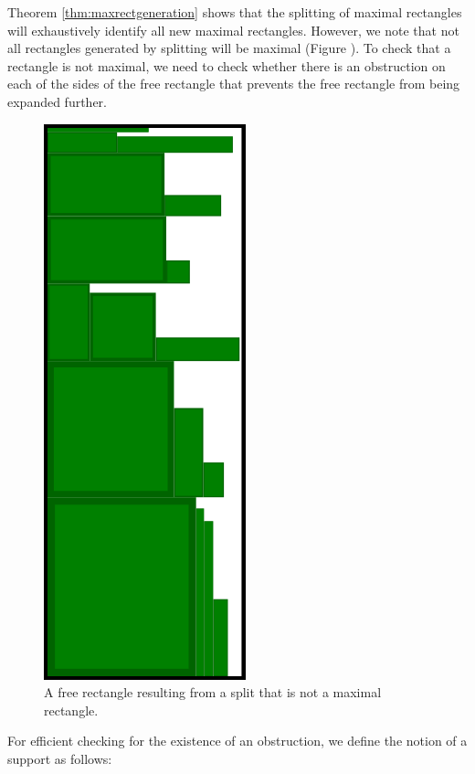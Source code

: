 \documentclass{article}
\begin{document}
\begin{defn}
\begin{defn}
Theorem \ref{thm:maxrectgeneration} shows that the splitting of maximal rectangles will exhaustively identify all new maximal rectangles. However, we note that not all rectangles generated by splitting will be maximal (Figure ). To check that a rectangle is not maximal, we need to check whether there is an obstruction on each of the sides of the free rectangle that prevents the free rectangle from being expanded further.

\begin{figure}[!h]
  \centering
  \includegraphics[width=.5\linewidth]{FFDHrun.png}
  \caption{A free rectangle resulting from a split that is not a maximal rectangle.}
  \label{fig:splitbutnotmaxrect}
\end{figure}

For efficient checking for the existence of an obstruction, we define the notion of a support as follows:


\end{defn}
\end{defn}
\end{document}
